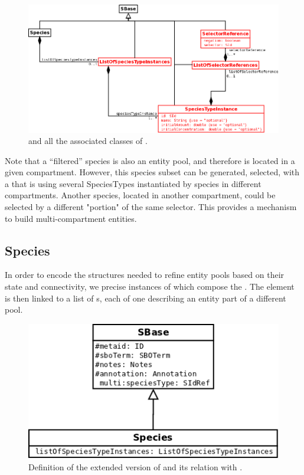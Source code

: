 \begin{figure}[h!]
\begin{center}
\includegraphics[scale=0.3]{./figs/pngs/SpeciesGeneral.png}
\caption{ and all the associated classes of \multiVone.}
\end{center}
\end{figure}

Note that a ``filtered'' species is also an entity pool, and therefore is located in a given compartment. However, this species subset can be generated, selected, with a  that is using several SpeciesTypes instantiated by species in different compartments. Another species, located in another compartment, could be selected by a different "portion" of the same selector. This provides a mechanism to build multi-compartment entities.

\subsection{Species}

In order to encode the structures needed to refine entity pools based on their state and connectivity, we precise instances of which  compose the . The element  is then linked to a list of s, each of one describing an entity part of a different pool.

\begin{figure}[H]
\begin{center}
\includegraphics[scale=0.3]{figs/pngs/SpeciesClass.png} 
\caption{Definition of the extended version of  and its relation with .}
\label{fig:SpeciesClass}
\end{center}
\end{figure}

